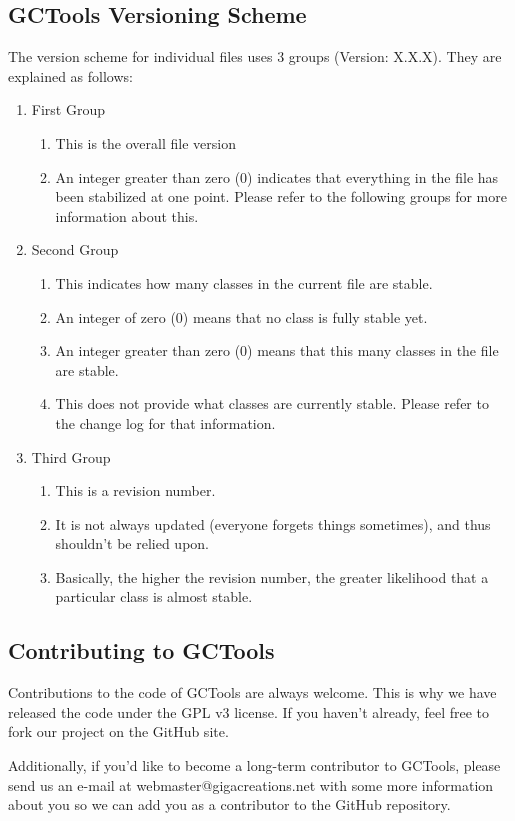 \documentclass{article}
\begin{document}
\subsection{GCTools Versioning Scheme}
The version scheme for individual files uses 3 groups (Version: X.X.X). They are explained as follows:
\begin{enumerate}
\item First Group
\begin{enumerate}
\item This is the overall file version
\item An integer greater than zero (0) indicates that everything in the file has been stabilized at one point. Please refer to the following groups for more information about this.
\end{enumerate}
\item Second Group
\begin{enumerate}
\item This indicates how many classes in the current file are stable.
\item An integer of zero (0) means that no class is fully stable yet.
\item An integer greater than zero (0) means that this many classes in the file are stable.
\item This does not provide what classes are currently stable. Please refer to the change log for that information.
\end{enumerate}
\item Third Group
\begin{enumerate}
\item This is a revision number.
\item It is not always updated (everyone forgets things sometimes), and thus shouldn't be relied upon.
\item Basically, the higher the revision number, the greater likelihood that a particular class is almost stable.
\end{enumerate}
\end{enumerate}

\subsection{Contributing to GCTools}
Contributions to the code of GCTools are always welcome. This is why we have released the code under the GPL v3 license. If you haven't already, feel free to fork our project on the GitHub site.

Additionally, if you'd like to become a long-term contributor to GCTools, please send us an e-mail at webmaster@gigacreations.net with some more information about you so we can add you as a contributor to the GitHub repository.
\end{document}
